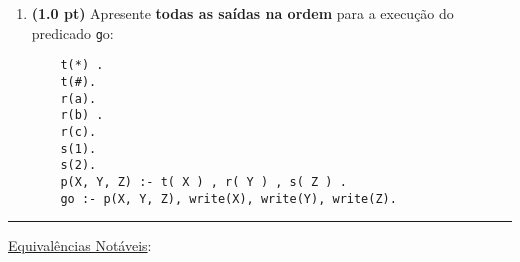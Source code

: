 \documentclass[11pt, a4paper,final]{article}
\begin{document}
\begin{enumerate}
\item {\bf (1.0 pt)} Apresente \textbf{todas as saídas na ordem} para a execução do predicado {\texttt go}:
\begin{verbatim}
	t(*) .
	t(#).
	r(a).
	r(b) .
	r(c).
	s(1).
	s(2).
	p(X, Y, Z) :- t( X ) , r( Y ) , s( Z ) .
	go :- p(X, Y, Z), write(X), write(Y), write(Z).
\end{verbatim}


\end{enumerate}


\noindent\rule{0.8\textwidth}{2pt}



\underline{{\large Equivalências Notáveis}}:
\end{document}
